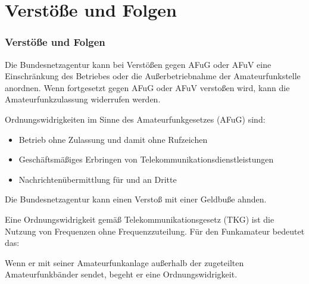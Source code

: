 
\section{Verstöße und Folgen}
\label{section:verstoesse_und_folgen}
\begin{frame}%

\frametitle{Verstöße und Folgen}
Die Bundesnetzagentur kann bei Verstößen gegen AFuG oder AFuV eine Einschränkung des Betriebes oder die Außerbetriebnahme der Amateurfunkstelle anordnen. Wenn fortgesetzt gegen AFuG oder AFuV verstoßen wird, kann die Amateurfunkzulassung widerrufen werden.

\end{frame}

\begin{frame}Ordnungswidrigkeiten im Sinne des Amateurfunkgesetzes (AFuG) sind:

\begin{itemize}
  \item Betrieb ohne Zulassung und damit ohne Rufzeichen
  \item Geschäftsmäßiges Erbringen von Telekommunikationsdienstleistungen
  \item Nachrichtenübermittlung für und an Dritte
  \end{itemize}
    \pause
    Die Bundesnetzagentur kann einen Verstoß mit einer Geldbuße ahnden.



\end{frame}

\begin{frame}Eine Ordnungswidrigkeit gemäß Telekommunikationsgesetz (TKG) ist die Nutzung von Frequenzen ohne Frequenzzuteilung. Für den Funkamateur bedeutet das:

Wenn er mit seiner Amateurfunkanlage außerhalb der zugeteilten Amateurfunkbänder sendet, begeht er eine Ordnungswidrigkeit.

\end{frame}

\begin{frame}
\end{frame}

